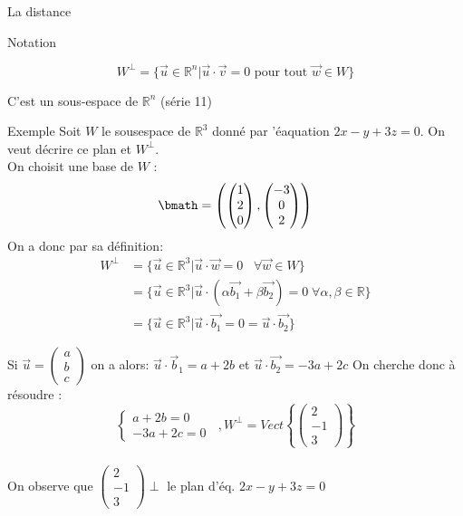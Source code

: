 \begin{parag}{La distance}
\begin{subparag}{Notation}
            \begin{formule}
                \[W^\perp = \{\vec{u} \in \mathbb{R}^n| \vec{u} \cdot \vec{v} = 0 \text{ pour tout } \vec{w} \in W\}\]
            \end{formule}
            C'est un sous-espace de $\mathbb{R}^n$ (série 11)
        \end{subparag}
        \begin{subparag}{Exemple}
            Soit $W$ le sousespace de $\mathbb{R}^3$ donné par 'éaquation $2x -y + 3z = 0$. On veut décrire ce plan et $W^\perp$.
            \\
            On choisit une base de $W$ : 
            \[\bmath = \left(\begin{pmatrix}
                1 \\ 2 \\ 0
            \end{pmatrix}, \begin{pmatrix}
                -3 \\ 0 \\ 2
            \end{pmatrix}\right)\]
            On a donc par sa définition:
            \begin{align*}
              W^\perp &= \{\vec{u} \in \mathbb{R}^3|  \vec
            u\cdot \vec{w} = 0 \;\;\;\forall \vec{w} \in W\}\\  
            &= \{\vec{u} \in \mathbb{R}^3|\vec{u}\cdot(\alpha\vec{b_1} + \beta\vec{b_2}) = 0 \; \forall\alpha, \beta \in \mathbb{R}\}\\
            &= \{\vec{u} \in \mathbb{R}^3| \vec{u}\cdot\vec{b_1} = 0 = \vec{u}\cdot\vec{b_2}\}
            \end{align*}

            
            Si $\vec{u} = \begin{pmatrix}
                a \\ b \\ c
            \end{pmatrix}$ on a alors: 
            $\vec{u} \cdot \vec{b}_1 = a + 2b$ et $\vec{u}\cdot \vec{b_2} = -3a + 2c$
            On cherche donc à résoudre : 
            \[\begin{cases}
                a + 2b = 0\\
                -3a + 2c = 0
            \end{cases}\; \; , W^\perp = Vect\left\{\begin{pmatrix}
                2 \\ -1 \\ 3
            \end{pmatrix}\right\}\]
            \\
            On observe que $\begin{pmatrix}
                2 \\ -1 \\ 3 
            \end{pmatrix}\perp$ le plan d'éq. $2x -y + 3z = 0$
        \end{subparag}

\end{parag}

